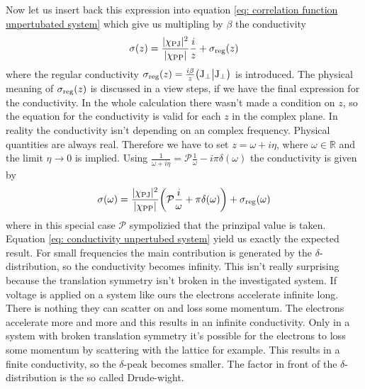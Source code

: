 %
Now let us insert back this expression into equation \eqref{eq: correlation function unpertubated system} which give us multipling by $\beta$ the conductivity
%
\begin{align}
	\sigma (z) = \frac{\vert\chi_{\mathrm{PJ}}\vert^{2}}{\vert\chi_{\mathrm{PP}}\vert} \frac{i}{z}  + \sigma_{\mathrm{reg}}(z)
\end{align}
%
where the regular conductivity $\sigma_{\mathrm{reg}}(z) = \frac{i \beta}{z} \big({\mathrm{J}_{\bot}}\big|{\mathrm{J}_{\bot}}\big)$ is introduced.
The physical meaning of $\sigma_{\mathrm{reg}}(z)$ is discussed in a view steps, if we have the final expression for the conductivity.
In the whole calculation there wasn't made a condition on $z$, so the equation for the conductivity is valid for each $z$ in the complex plane.
In reality the conductivity isn't depending on an complex frequency.
Physical quantities are always real.
Therefore we have to set $z = \omega + i \eta$, where $\omega \in \mathbb{R}$ and the limit $\eta \to 0$ is implied.
Using $\frac{1}{\omega + i\eta} = \mathcal{P}\frac{1}{\omega} - i\pi\delta(\omega)$ the conductivity is given by
%
\begin{align}
	\sigma(\omega) = \frac{\vert\chi_{\mathrm{PJ}}\vert^{2}}{\vert\chi_{\mathrm{PP}}\vert} \bigg( \mathcal{P} \frac{i}{\omega} + \pi \delta(\omega) \bigg) + \sigma_{\mathrm{reg}}(\omega)
	\label{eq: conductivity unpertubed system}
\end{align}
%
where in this special case $\mathcal{P}$ sympolizied that the prinzipal value is taken.
Equation \eqref{eq: conductivity unpertubed system} yield us exactly the expected result.
For small frequencies the main contribution is generated by the $\delta$-distribution, so the conductivity becomes infinity.
This isn't really surprising because the translation symmetry isn't broken in the investigated system.
If voltage is applied on a system like ours the electrons accelerate infinite long.
There is nothing they can scatter on and loss some momentum.
The electrons accelerate more and more and this results in an infinite conductivity.
Only in a system with broken translation symmetry it's possible for the electrons to loss some momentum by scattering with the lattice for example.
This results in a finite conductivity, so the $\delta$-peak becomes smaller.
The factor in front of the $\delta$-distribution is the so called Drude-wight.

